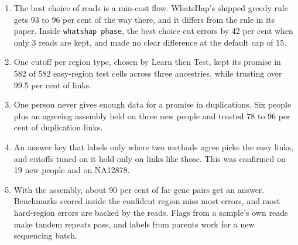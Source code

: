 \documentclass[11pt]{article}
\newcommand{\code}[1]{\texttt{#1}}
\begin{document}
\begin{enumerate}
\item The best choice of reads is a min-cost flow. WhatsHap's shipped greedy
  rule gets 93 to 96 per cent of the way there, and it differs from the rule
  in its paper. Inside \code{whatshap phase}, the best choice cut errors by
  42 per cent when only 3 reads are kept, and made no clear difference at
  the default cap of 15.
\item One cutoff per region type, chosen by Learn then Test, kept its
  promise in 582 of 582 easy-region test cells across three ancestries,
  while trusting over 99.5 per cent of links.
\item One person never gives enough data for a promise in duplications. Six
  people plus an agreeing assembly held on three new people and trusted 78
  to 96 per cent of duplication links.
\item An answer key that labels only where two methods agree picks the easy
  links, and cutoffs tuned on it hold only on links like those. This was
  confirmed on 19 new people and on NA12878.
\item With the assembly, about 90 per cent of far gene pairs get an answer.
  Benchmarks scored inside the confident region miss most errors, and most
  hard-region errors are backed by the reads. Flags from a sample's own
  reads make tandem repeats pass, and labels from parents work for a new
  sequencing batch.
\end{enumerate}
\end{document}
